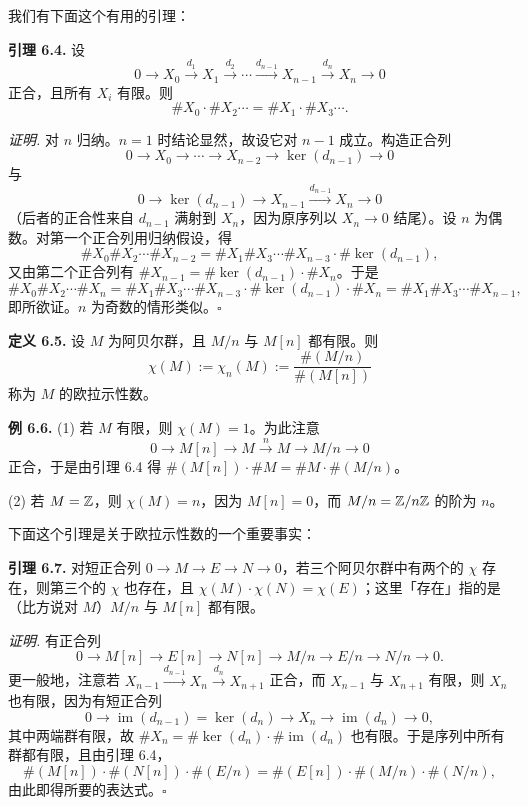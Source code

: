 我们有下面这个有用的引理：

\textbf{引理 6.4.} 设
\[
0\to X_0\xrightarrow{d_1}X_1\xrightarrow{d_2}\cdots\xrightarrow{d_{n-1}}X_{n-1}\xrightarrow{d_n}X_n\to 0
\]
正合，且所有 $X_i$ 有限。则
\[
\#X_0\cdot\#X_2\cdots=\#X_1\cdot\#X_3\cdots.
\]

\textit{证明.} 对 $n$ 归纳。$n=1$ 时结论显然，故设它对 $n-1$ 成立。构造正合列
\[
0\to X_0\to\cdots\to X_{n-2}\to\ker(d_{n-1})\to 0
\]
与
\[
0\to\ker(d_{n-1})\to X_{n-1}\xrightarrow{d_{n-1}}X_n\to 0
\]
（后者的正合性来自 $d_{n-1}$ 满射到 $X_n$，因为原序列以 $X_n\to 0$ 结尾）。设 $n$ 为偶数。对第一个正合列用归纳假设，得
\[
\#X_0\#X_2\cdots\#X_{n-2}=\#X_1\#X_3\cdots\#X_{n-3}\cdot\#\ker(d_{n-1}),
\]
又由第二个正合列有 $\#X_{n-1}=\#\ker(d_{n-1})\cdot\#X_n$。于是
\[
\#X_0\#X_2\cdots\#X_n
=\#X_1\#X_3\cdots\#X_{n-3}\cdot\#\ker(d_{n-1})\cdot\#X_n
=\#X_1\#X_3\cdots\#X_{n-1},
\]
即所欲证。$n$ 为奇数的情形类似。\hfill$\square$

\textbf{定义 6.5.} 设 $M$ 为阿贝尔群，且 $M/n$ 与 $M[n]$ 都有限。则
\[
\chi(M):=\chi_n(M):=\frac{\#(M/n)}{\#(M[n])}
\]
称为 $M$ 的欧拉示性数。

\textbf{例 6.6.} (1) 若 $M$ 有限，则 $\chi(M)=1$。为此注意
\[
0\to M[n]\to M\xrightarrow{\ n\ }M\to M/n\to 0
\]
正合，于是由引理 6.4 得 $\#(M[n])\cdot\#M=\#M\cdot\#(M/n)$。

(2) 若 $M=\mathbb{Z}$，则 $\chi(M)=n$，因为 $M[n]=0$，而 $M/n=\mathbb{Z}/n\mathbb{Z}$ 的阶为 $n$。

下面这个引理是关于欧拉示性数的一个重要事实：

\textbf{引理 6.7.} 对短正合列 $0\to M\to E\to N\to 0$，若三个阿贝尔群中有两个的 $\chi$ 存在，则第三个的 $\chi$ 也存在，且 $\chi(M)\cdot\chi(N)=\chi(E)$；这里「存在」指的是（比方说对 $M$）$M/n$ 与 $M[n]$ 都有限。

\textit{证明.} 有正合列
\[
0\to M[n]\to E[n]\to N[n]\to M/n\to E/n\to N/n\to 0.
\]
更一般地，注意若 $X_{n-1}\xrightarrow{d_{n-1}}X_n\xrightarrow{d_n}X_{n+1}$ 正合，而 $X_{n-1}$ 与 $X_{n+1}$ 有限，则 $X_n$ 也有限，因为有短正合列
\[
0\to\operatorname{im}(d_{n-1})=\ker(d_n)\to X_n\to\operatorname{im}(d_n)\to 0,
\]
其中两端群有限，故 $\#X_n=\#\ker(d_n)\cdot\#\operatorname{im}(d_n)$ 也有限。于是序列中所有群都有限，且由引理 6.4，
\[
\#(M[n])\cdot\#(N[n])\cdot\#(E/n)=\#(E[n])\cdot\#(M/n)\cdot\#(N/n),
\]
由此即得所要的表达式。\hfill$\square$

